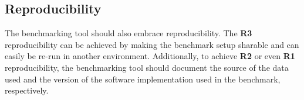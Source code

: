 \subsection{Reproducibility}
The benchmarking tool should also embrace reproducibility.
The \textbf{R3} reproducibility can be achieved by making the benchmark setup sharable and can easily be re-run in another environment.
Additionally, to achieve \textbf{R2} or even \textbf{R1} reproducibility, the benchmarking tool should document the source of the data used and the version of the software implementation used in the benchmark, respectively.
